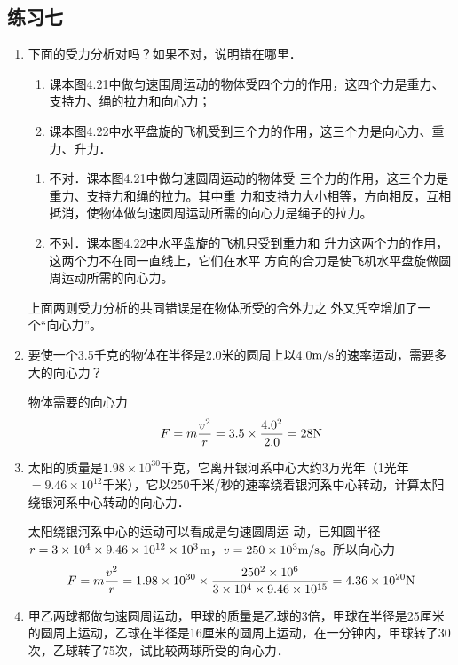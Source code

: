 \subsection{练习七}
\begin{enumerate}
	\item 下面的受力分析对吗？如果不对，说明错在哪里．
	\begin{enumerate}
		\item 课本图4.21中做匀速围周运动的物体受四个力的作用，这四个力是重力、支持力、绳的拉力和向心力；
		\item 课本图4.22中水平盘旋的飞机受到三个力的作用，这三个力是向心力、重力、升力．
	\end{enumerate}

    \begin{solution}
 \begin{enumerate}
     \item 不对．课本图4.21中做匀速圆周运动的物体受
     三个力的作用，这三个力是重力、支持力和绳的拉力。其中重
     力和支持力大小相等，方向相反，互相抵消，使物体做匀速圆周运动所需的向心力是绳子的拉力。
     \item 不对．课本图4.22中水平盘旋的飞机只受到重力和
     升力这两个力的作用，这两个力不在同一直线上，它们在水平
     方向的合力是使飞机水平盘旋做圆周运动所需的向心力。
 \end{enumerate}
     上面两则受力分析的共同错误是在物体所受的合外力之
     外又凭空增加了一个“向心力”。
    \end{solution}
\item 要使一个3.5千克的物体在半径是2.0米的圆周上以4.0$\text{m}/\text{s}$的速率运动，需要多大的向心力？

\begin{solution}
    物体需要的向心力
\[F=m\frac{v^2}{r}=3.5\times \frac{4.0^2}{2.0}=28{\rm N}\]
\end{solution}
\item 太阳的质量是$1.98\times 10^{30}$千克，它离开银河系中心大约3万光年（1光年$=9.46\times 10^{12}$千米），它以250千米/秒的速率绕着银河系中心转动，计算太阳绕银河系中心转动的向心力．

\begin{solution}
    太阳绕银河系中心的运动可以看成是匀速圆周运
    动，已知圆半径$r=3\times10^4\times9.46\times10^{12}\times10^3$m，$v=250\times10^3\text{m}/\text{s}$。所以向心力
\[F=m\frac{v^2}{r}=1.98\times 10^{30}\times \frac{250^2\times 10^6}{3\times 10^4\times 9.46\times 10^{15}}=4.36\times 10^{20}{\rm N}\]
\end{solution}
\item 甲乙两球都做匀速圆周运动，甲球的质量是乙球的3倍，甲球在半径是25厘米的圆周上运动，乙球在半径是16厘米的圆周上运动，在一分钟内，甲球转了30次，乙球转了75次，试比较两球所受的向心力．


\end{enumerate}
